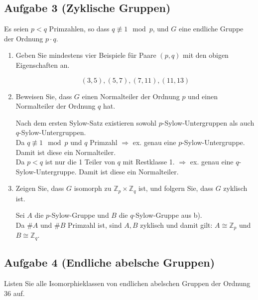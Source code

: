 \documentclass[11pt,a4paper,ngerman]{article}
\newcommand{\Z}{\mathbb{Z}}
\begin{document}

\subsection*{Aufgabe 3 \mdseries (Zyklische Gruppen)}
Es seien $p < q$ Primzahlen, so dass $q \not\equiv 1 \mod p$, und $G$ eine endliche Gruppe der Ordnung $p \cdot q$.
\begin{enumerate}[\bfseries a)]
\item Geben Sie mindestens vier Beispiele für Paare $(p,q)$ mit den obigen Eigenschaften an.

$$ (3, 5), (5, 7), (7, 11), (11, 13) $$

\item Beweisen Sie, dass $G$ einen Normalteiler der Ordnung $p$ und einen Normalteiler der Ordnung $q$ hat.

Nach dem ersten Sylow-Satz existieren sowohl $p$-Sylow-Untergruppen als auch $q$-Sylow-Untergruppen.\\
Da $q \not\equiv 1 \mod p$ und $q$ Primzahl $\Rightarrow$ ex. genau eine $p$-Sylow-Untergruppe. Damit ist diese ein Normalteiler. \\
Da $p < q$ ist nur die 1 Teiler von $q$ mit Restklasse 1. $\Rightarrow$ ex. genau eine $q$-Sylow-Untergruppe. Damit ist diese ein Normalteiler.

\item  Zeigen Sie, dass $G$ isomorph zu $\Z_p \times \Z_q$ ist, und folgern Sie, dass $G$ zyklisch ist.

Sei $A$ die $p$-Sylow-Gruppe und $B$ die $q$-Sylow-Gruppe aus b).\\
Da $\#A$ und $\#B$ Primzahl ist, sind $A, B$ zyklisch und damit gilt: $A \cong \Z_p$ und $B \cong \Z_q$.
\end{enumerate}


\subsection*{Aufgabe 4 \mdseries (Endliche abelsche Gruppen)}
Listen Sie alle Isomorphieklassen von endlichen abelschen Gruppen der Ordnung 36
auf.

\label{LastPage}
\end{document}
